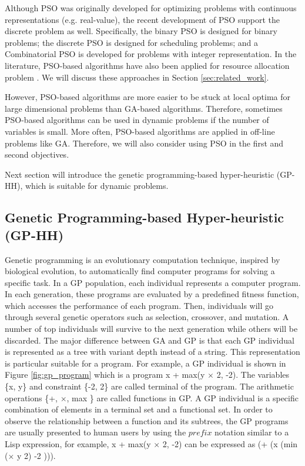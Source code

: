  Although PSO was originally developed for optimizing problems with continuous representations (e.g. real-value), the recent development of PSO support the discrete problem as well. Specifically, the binary PSO \cite{Kennedy:1997hd} is designed for binary problems; the discrete PSO \cite{Liao:2007dl} is designed for scheduling problems; and a Combinatorial PSO \cite{Jarboui:2007in} is developed for problems with integer representation. In the literature, PSO-based algorithms have also been applied for resource allocation problem \cite{Xiong:2014jq}. We will discuss these approaches in Section \ref{sec:related_work}.


 However, PSO-based algorithms are more easier to be stuck at local optima for large dimensional problems than GA-based algorithms. Therefore, sometimes PSO-based algorithms can be used in dynamic problems if the number of variables is small. More often, PSO-based algorithms are applied in off-line problems like GA. Therefore, we will also consider using PSO in the first and second objectives.

Next section will introduce the genetic programming-based hyper-heuristic (GP-HH), which is suitable for dynamic problems.

\subsection{Genetic Programming-based Hyper-heuristic (GP-HH)}

Genetic programming \cite{1992gppc.book.....K} is an evolutionary computation technique, inspired by biological evolution, to automatically find 
computer programs for solving a specific task. In a GP population, each individual represents a computer program. In each generation, these programs are evaluated by a predefined fitness function, which accesses the performance of each program. Then, individuals will go through several genetic operators such as selection, crossover, and mutation. A number of top individuals will survive to the next generation while others will be discarded. The major difference between GA and GP is that each GP individual is represented as a tree with variant depth instead of a string. This representation is particular suitable for a program. For example,  a GP individual is shown in Figure \ref{fig:gp_program} which is a program x + max(y $\times$ 2, -2). The variables \{x, y\} and constraint \{-2, 2\} are called terminal of the program. The arithmetic operations \{+, $\times$, max \} are called functions in GP. A GP individual is a specific combination of elements in a terminal set and a functional set. In order to observe the relationship between a function and its subtrees, the GP programs are usually presented to human users by using the $prefix$ notation similar to a Lisp expression, for example, x + max(y $\times$ 2, -2) can be expressed as (+ (x (min ($\times$ y 2) -2 ))).

